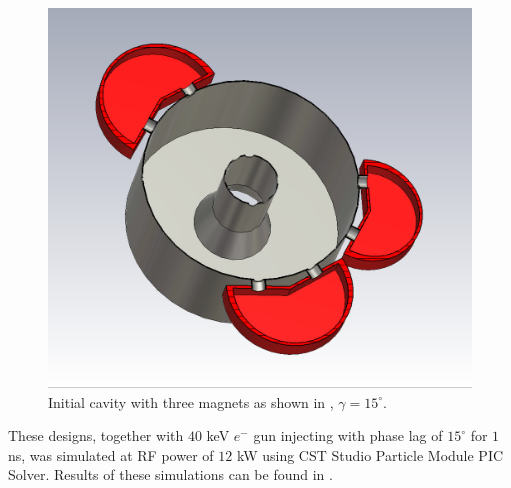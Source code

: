 \documentclass{article}
\begin{document}
\begin{figure}[H]
    \centering
    \includegraphics[width=.8\linewidth]{../../../figures/cst/cst_second_design2.png}
    \vspace{20pt}
    \caption{Initial cavity with three magnets as shown in , $\gamma=15^\circ$.}
    \label{fig:initial_three_magnet_design}
\end{figure}
These designs, together with $40$ keV $e^-$ gun injecting with phase lag of $15^\circ$ for $1$ ns, was simulated at RF power of $12$ kW using CST Studio Particle Module PIC Solver.
Results of these simulations can be found in .
\end{document}
